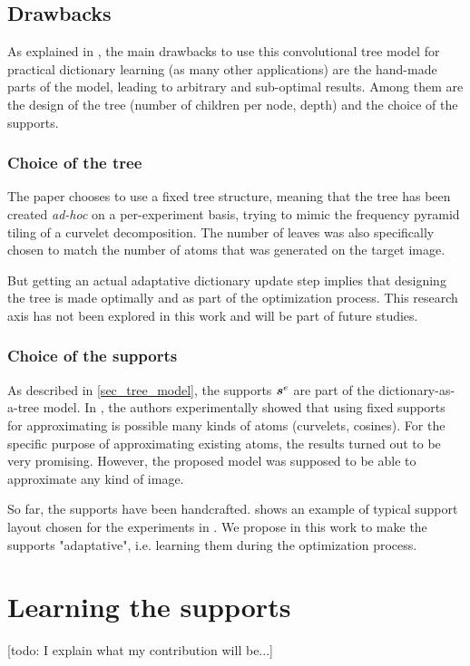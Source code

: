 \subsection{Drawbacks}
As explained in \cite[p. 23]{chabiron_optimization_2016}, the main drawbacks to use this convolutional tree model for practical dictionary learning (as many other applications) are the hand-made parts of the model, leading to arbitrary and sub-optimal results. Among them are the design of the tree (number of children per node, depth) and the choice of the supports.
\subsubsection{Choice of the tree}
The paper chooses to use a fixed tree structure, meaning that the tree has been created \emph{ad-hoc} on a per-experiment basis, trying to mimic the frequency pyramid tiling of a curvelet decomposition. The number of leaves was also specifically chosen to match the number of atoms that was generated on the target image.

But getting an actual adaptative dictionary update step implies that designing the tree is made optimally and as part of the optimization process. This research axis has not been explored in this work and will be part of future studies.

\subsubsection{Choice of the supports}

As described in \cref{sec_tree_model}, the supports $\bm{s}^e$ are part of the dictionary-as-a-tree model. In \cite{chabiron_toward_2015}, the authors experimentally showed that using fixed supports for approximating is possible many kinds of atoms (curvelets, cosines). For the specific purpose of approximating existing atoms, the results turned out to be very promising. However, the proposed model was supposed to be able to approximate any kind of image.

So far, the supports have been handcrafted.  shows an example of typical support layout chosen for the experiments in \cite{chabiron_optimization_2016}. We propose in this work to make the supports "adaptative", i.e. learning them during the optimization process.

\section{Learning the supports}
[todo: I explain what my contribution will be...]

